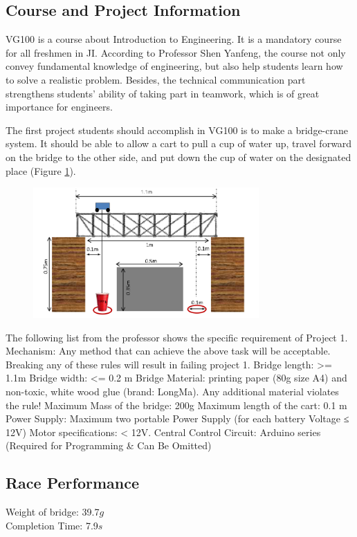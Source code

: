 \subsection{Course and Project Information}


VG100 is a course about Introduction to Engineering. It is a mandatory course
for all freshmen in JI. According to Professor Shen Yanfeng, the course not only
convey fundamental knowledge of engineering, but also help students learn how to
solve a realistic problem. Besides, the technical communication part strengthens
students’ ability of taking part in teamwork, which is of great importance for
engineers.  

The first project students should accomplish in VG100 is to make a bridge-crane
system. It should be able to allow a cart to pull a cup of water up, travel
forward on the bridge to the other side, and put down the cup of water on the
designated place (Figure \ref{fig:structureOfP1}).  

\begin{figure}[htbp]
\centering
\includegraphics[height=5cm]{figure/structureOfP1}
\caption{\label{fig:structureOfP1}}
\end{figure}

The following list from the professor shows the specific requirement of Project 1.
Mechanism: Any method that can achieve the above task will be acceptable.
Breaking any of these rules will result in failing project 1.  
Bridge length:  >= 1.1m 
Bridge width:  <= 0.2 m 
Bridge Material: printing paper (80g size A4) and non-toxic, white wood glue
(brand: LongMa). Any additional material violates the rule!  
Maximum Mass of the bridge: 200g 
Maximum length of the cart: 0.1 m 
Power Supply: Maximum two portable Power Supply (for each battery Voltage ≤ 12V) 
Motor specifications: < 12V.  
Central Control Circuit: Arduino series (Required for Programming \& Can Be Omitted)

\subsection{Race Performance}
Weight of bridge: 39.7$g$ \\
Completion Time: 7.9$s$